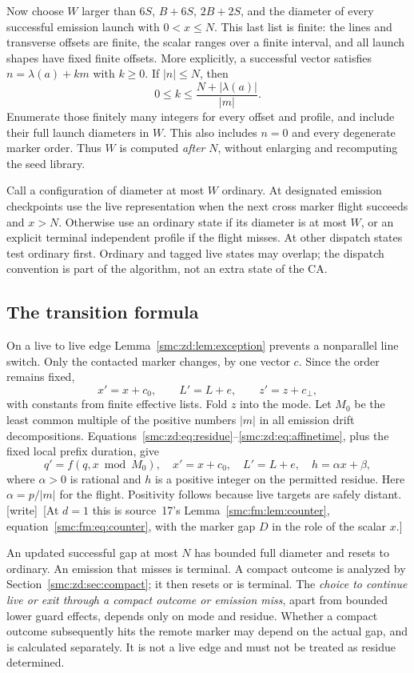 \documentclass[11pt,letterpaper]{article}
\numberwithin{equation}{section}
\theoremstyle{definition}
\theoremstyle{remark}
\newcommand{\wtag}{\textup{[write]}}
\begin{document}
Now choose $W$ larger than $6S$, $B+6S$, $2B+2S$, and the diameter of every successful emission launch with $0<x\le N$. This last list is finite: the lines and transverse offsets are finite, the scalar ranges over a finite interval, and all launch shapes have fixed finite offsets. More explicitly, a successful vector satisfies $n=\lambda(a)+km$ with $k\ge0$. If $|n|\le N$, then
\[
 0\le k\le\frac{N+|\lambda(a)|}{|m|}.
\]
Enumerate those finitely many integers for every offset and profile, and include their full launch diameters in $W$. This also includes $n=0$ and every degenerate marker order. Thus $W$ is computed \emph{after} $N$, without enlarging and recomputing the seed library.

Call a configuration of diameter at most $W$ ordinary. At designated emission checkpoints use the live representation when the next cross marker flight succeeds and $x>N$. Otherwise use an ordinary state if its diameter is at most $W$, or an explicit terminal independent profile if the flight misses. At other dispatch states test ordinary first. Ordinary and tagged live states may overlap; the dispatch convention is part of the algorithm, not an extra state of the CA.

\subsection{The transition formula}
On a live to live edge Lemma~\ref{smc:zd:lem:exception} prevents a nonparallel line switch. Only the contacted marker changes, by one vector $c$. Since the order remains fixed,
\[
 x'=x+c_0,\qquad L'=L+e,\qquad z'=z+c_\perp,
\]
with constants from finite effective lists. Fold $z$ into the mode. Let $M_0$ be the least common multiple of the positive numbers $|m|$ in all emission drift decompositions. Equations~\eqref{smc:zd:eq:residue}--\eqref{smc:zd:eq:affinetime}, plus the fixed local prefix duration, give
\begin{equation}\label{smc:zd:eq:machine}
 q'=f(q,x\bmod M_0),\quad x'=x+c_0,\quad
 L'=L+e,\quad h=\alpha x+\beta,
\end{equation}
where $\alpha>0$ is rational and $h$ is a positive integer on the permitted residue. Here $\alpha=p/|m|$ for the flight. Positivity follows because live targets are safely distant.
\wtag\ [At $d=1$ this is source~17's Lemma~\ref{smc:fm:lem:counter}, equation~\eqref{smc:fm:eq:counter}, with the marker gap $D$ in the role of the scalar $x$.]

An updated successful gap at most $N$ has bounded full diameter and resets to ordinary. An emission that misses is terminal. A compact outcome is analyzed by Section~\ref{smc:zd:sec:compact}; it then resets or is terminal. The \emph{choice to continue live or exit through a compact outcome or emission miss}, apart from bounded lower guard effects, depends only on mode and residue. Whether a compact outcome subsequently hits the remote marker may depend on the actual gap, and is calculated separately. It is not a live edge and must not be treated as residue determined.
\end{document}

